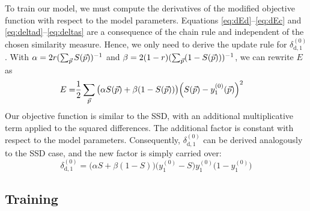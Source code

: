 To train our model, we must compute the derivatives of the modified objective
function with respect to the model parameters. Equations
\ref{eq:dEd}--\ref{eq:dEc} and \ref{eq:deltad}--\ref{eq:deltas} are a
consequence of the chain rule and independent of the chosen similarity measure.
Hence, we only need to derive the update rule for $\delta^{(0)}_{\text{d},1}$.
With $\alpha = 2r (\sum_{\vec{p}}S(\vec{p}))^{-1}$ and $\beta = 2(1 -
r)(\sum_{\vec{p}}(1 - S(\vec{p})))^{-1}$, we can rewrite $E$ as
\begin{align}
E=& \frac{1}{2}\sum_{\vec{p}}\big(\alpha S(\vec{p}) +
\beta(1-S(\vec{p}))\big)\Big(S(\vec{p})-y^{(0)}_1(\vec{p})\Big)^2
\end{align}
%
Our objective function is similar to the SSD, with an additional multiplicative
term applied to the squared differences. The additional factor is constant with
respect to the model parameters. Consequently, $\delta^{(0)}_{\text{d},1}$ can
be derived analogously to the SSD case, and the new factor is simply carried
over:
\begin{equation} 
\delta^{(0)}_{\text{d},1} = \big(\alpha S + \beta (1 - S)\big)\big(y^{(0)}_1 -
S\big) y^{(0)}_1 \big(1 - y^{(0)}_1\big)
\end{equation}


\subsection{Training}

